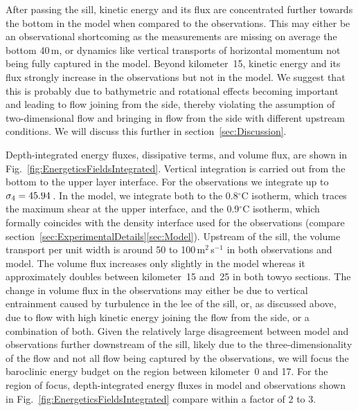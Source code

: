 \documentclass{ametsocV6.1}
\begin{document}
After passing the sill, kinetic energy and its flux are concentrated further towards the bottom in the model when compared to the observations.
This may either be an observational shortcoming as the measurements are missing on average the bottom 40\,m, or dynamics like vertical transports of horizontal momentum not being fully captured in the model.
Beyond kilometer~15, kinetic energy and its flux strongly increase in the observations but not in the model.
We suggest that this is probably due to bathymetric and rotational effects becoming important and leading to flow joining from the side, thereby violating the assumption of two-dimensional flow and bringing in flow from the side with different upstream conditions.
We will discuss this further in section~\ref{sec:Discussion}.

Depth-integrated energy fluxes, dissipative terms, and volume flux,  are shown in Fig.~\ref{fig:EnergeticsFieldsIntegrated}.
Vertical integration is carried out from the bottom to the upper layer interface.
For the observations we integrate up to $\sigma_4=45.94$\,\TyUpperIntLimitUnit.
In the model, we integrate both to the 0.8$^{\circ}$C isotherm, which traces the maximum shear at the upper interface, and the 0.9$^{\circ}$C isotherm, which formally coincides with the density interface used for the observations (compare section~\ref{sec:ExperimentalDetails}\ref{sec:Model}).
Upstream of the sill, the volume transport per unit width is around 50 to 100\,m$^2$\,s$^{-1}$ in both observations and model.
The volume flux increases only slightly in the model whereas it approximately doubles between kilometer~15 and~25 in both towyo sections.
The change in volume flux in the observations may either be due to vertical entrainment caused by turbulence in the lee of the sill, or, as discussed above, due to flow with high kinetic energy joining the flow from the side, or a combination of both.
Given the relatively large disagreement between model and observations further downstream of the sill, likely due to the three-dimensionality of the flow and not all flow being captured by the observations, we will focus the baroclinic energy budget on the region between kilometer~0 and 17.
For the region of focus, depth-integrated energy fluxes in model and observations shown in Fig.~\ref{fig:EnergeticsFieldsIntegrated} compare within a factor of 2 to 3.
\end{document}
